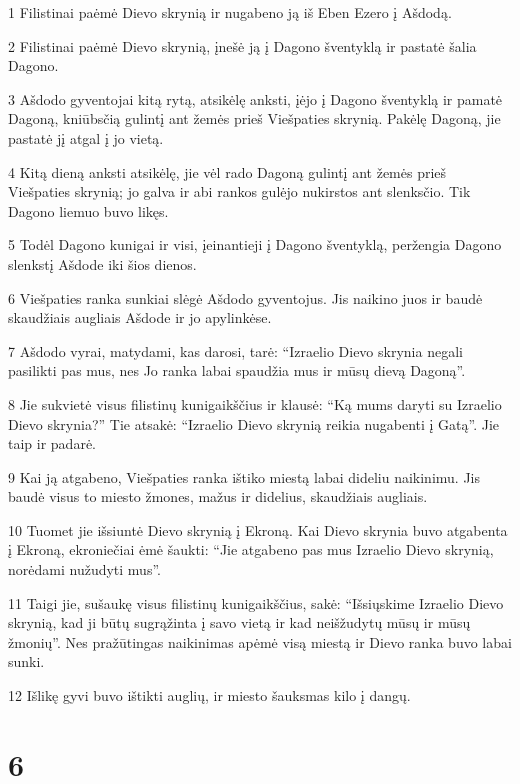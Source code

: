 \par 1 Filistinai paėmė Dievo skrynią ir nugabeno ją iš Eben Ezero į Ašdodą. 
\par 2 Filistinai paėmė Dievo skrynią, įnešė ją į Dagono šventyklą ir pastatė šalia Dagono. 
\par 3 Ašdodo gyventojai kitą rytą, atsikėlę anksti, įėjo į Dagono šventyklą ir pamatė Dagoną, kniūbsčią gulintį ant žemės prieš Viešpaties skrynią. Pakėlę Dagoną, jie pastatė jį atgal į jo vietą. 
\par 4 Kitą dieną anksti atsikėlę, jie vėl rado Dagoną gulintį ant žemės prieš Viešpaties skrynią; jo galva ir abi rankos gulėjo nukirstos ant slenksčio. Tik Dagono liemuo buvo likęs. 
\par 5 Todėl Dagono kunigai ir visi, įeinantieji į Dagono šventyklą, peržengia Dagono slenkstį Ašdode iki šios dienos. 
\par 6 Viešpaties ranka sunkiai slėgė Ašdodo gyventojus. Jis naikino juos ir baudė skaudžiais augliais Ašdode ir jo apylinkėse. 
\par 7 Ašdodo vyrai, matydami, kas darosi, tarė: “Izraelio Dievo skrynia negali pasilikti pas mus, nes Jo ranka labai spaudžia mus ir mūsų dievą Dagoną”. 
\par 8 Jie sukvietė visus filistinų kunigaikščius ir klausė: “Ką mums daryti su Izraelio Dievo skrynia?” Tie atsakė: “Izraelio Dievo skrynią reikia nugabenti į Gatą”. Jie taip ir padarė. 
\par 9 Kai ją atgabeno, Viešpaties ranka ištiko miestą labai dideliu naikinimu. Jis baudė visus to miesto žmones, mažus ir didelius, skaudžiais augliais. 
\par 10 Tuomet jie išsiuntė Dievo skrynią į Ekroną. Kai Dievo skrynia buvo atgabenta į Ekroną, ekroniečiai ėmė šaukti: “Jie atgabeno pas mus Izraelio Dievo skrynią, norėdami nužudyti mus”. 
\par 11 Taigi jie, sušaukę visus filistinų kunigaikščius, sakė: “Išsiųskime Izraelio Dievo skrynią, kad ji būtų sugrąžinta į savo vietą ir kad neišžudytų mūsų ir mūsų žmonių”. Nes pražūtingas naikinimas apėmė visą miestą ir Dievo ranka buvo labai sunki. 
\par 12 Išlikę gyvi buvo ištikti auglių, ir miesto šauksmas kilo į dangų.



\chapter{6}

